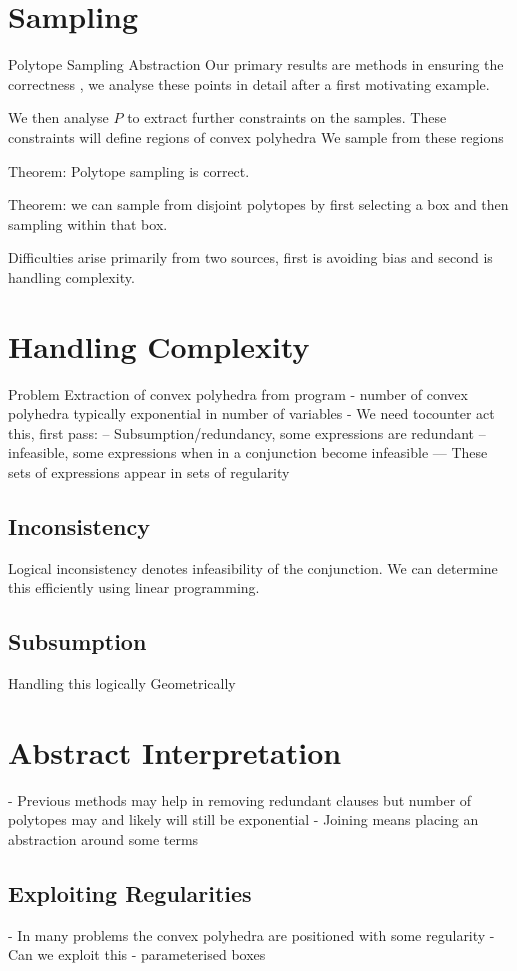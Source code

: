 \section{Sampling}
Polytope Sampling
Abstraction
Our primary results are methods in ensuring the correctness , we analyse these points in detail after a first motivating example.

We then analyse $P$ to extract further constraints on the samples.
These constraints will define regions of convex polyhedra
We sample from these regions

Theorem: Polytope sampling is correct.

Theorem: we can sample from disjoint polytopes by first selecting a box and then sampling within that box.

Difficulties arise primarily from two sources, first is avoiding bias and second is handling complexity.

\section{Handling Complexity}
Problem
Extraction of convex polyhedra from program
- number of convex polyhedra typically exponential in number of variables
- We need tocounter act this, first pass:
-- Subsumption/redundancy, some expressions are redundant
-- infeasible, some expressions when in a conjunction become infeasible
--- These sets of expressions appear in sets of regularity

\subsection{Inconsistency}
Logical inconsistency denotes infeasibility of the conjunction.
We can determine this efficiently using linear programming.

\subsection{Subsumption}
Handling this logically
Geometrically

\section{Abstract Interpretation}
- Previous methods may help in removing redundant clauses but number of polytopes may and likely will still be exponential
- Joining means placing an abstraction around some terms

\subsection{Exploiting Regularities}
- In many problems the convex polyhedra are positioned with some regularity
- Can we exploit this
- parameterised boxes

